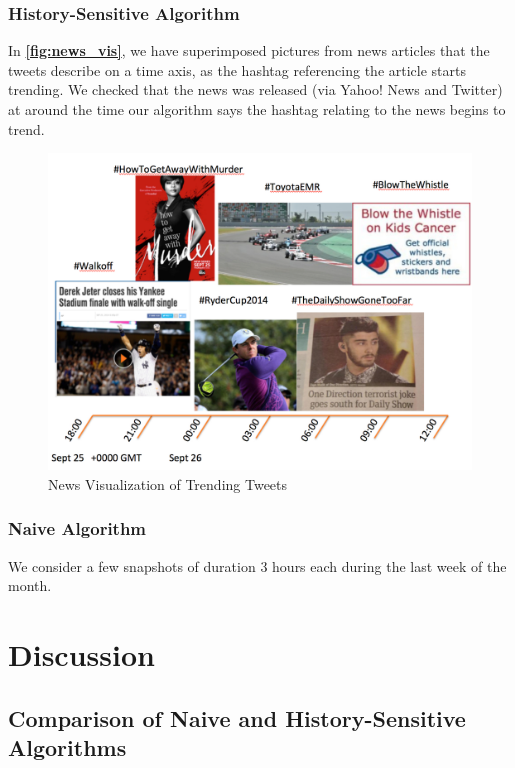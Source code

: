 \documentclass[twoside]{article}
\newcommand{\aref}[1]
 {\textbf{\autoref{#1}}}
\begin{document}
\subsubsection{History-Sensitive Algorithm}

In \aref{fig:news_vis}, we have superimposed pictures from 
news articles that the tweets describe on a time axis, as
the hashtag referencing the article starts trending. 
We checked that the news was released (via Yahoo! News and Twitter)
at around the time our algorithm says the hashtag relating to the news
begins to trend. 

\begin{figure} 
\centering
\includegraphics[scale = .4]{Timeline}
\caption{News Visualization of Trending Tweets}
\label{fig:news_vis}
\end{figure}

\subsubsection{Naive Algorithm}

We consider a few snapshots of duration $3$ hours each during
the last week of the month. 


\section{Discussion}

\subsection{Comparison of Naive and History-Sensitive Algorithms}
\end{document}
